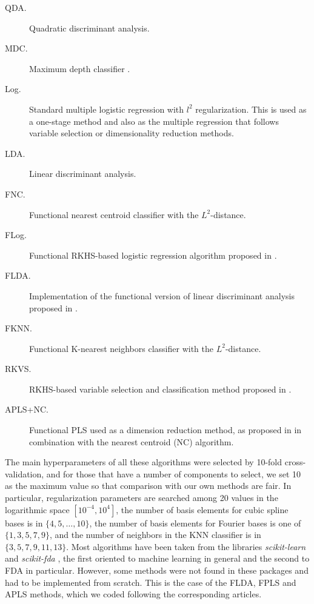 \begin{description}
  \item [QDA.] Quadratic discriminant analysis.
  \item [MDC.] Maximum depth classifier \citep[e.g.][]{ghosh2005maximum}.
  \item [Log.] Standard multiple logistic regression with \(l^2\) regularization. This is used as a one-stage method and also as the multiple regression that follows variable selection or dimensionality reduction methods.
  \item [LDA.] Linear discriminant analysis.
  \item [FNC.] Functional nearest centroid classifier with the \(L^2\)-distance.
  \item [FLog.] Functional RKHS-based logistic regression algorithm proposed in \citet{berrendero2023functional}.
  \item [FLDA.] Implementation of the functional version of linear discriminant analysis proposed in \citet{preda2007pls}.
  \item [FKNN.] Functional K-nearest neighbors classifier with the \(L^2\)-distance.
  \item [RKVS.] RKHS-based variable selection and classification method proposed in \citet{berrendero2018use}.
  \item [APLS+NC.] Functional PLS used as a dimension reduction method, as proposed in \citet{delaigle2012achieving} in combination with the nearest centroid (NC) algorithm.
\end{description}

The main hyperparameters of all these algorithms were selected by 10-fold cross-validation, and for those that have a number of components to select, we set 10 as the maximum value so that comparison with our own methods are fair. In particular, regularization parameters are searched among 20 values in the logarithmic space \([10^{-4}, 10^4]\), the number of basis elements for cubic spline bases is in \(\{4,5,\dots,10\}\), the number of basis elements for Fourier bases is one of \(\{1,3,5,7,9\}\), and the number of neighbors in the KNN classifier is in \(\{3,5,7,9,11,13\}\). Most algorithms have been taken from the libraries \textit{scikit-learn} \citep{pedregosa2011scikit} and \textit{scikit-fda} \citep{ramos2024scikit}, the first oriented to machine learning in general and the second to FDA in particular. However, some methods were not found in these packages and had to be implemented from scratch. This is the case of the FLDA, FPLS and APLS methods, which we coded following the corresponding articles.

